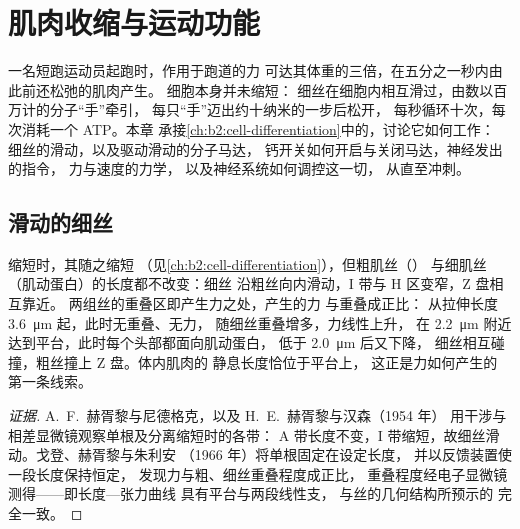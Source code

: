\chapter{肌肉收缩与运动功能}\label{ch:b2:muscle-movement}

一名短跑运动员起跑时，作用于跑道的力
可达其体重的三倍，在五分之一秒内由此前还松弛的肌肉产生。
细胞本身并未缩短：
细丝在细胞内相互滑过，由数以百万计的分子“手”牵引，
每只“手”迈出约十纳米的一步后松开，
每秒循环十次，每次消耗一个 ATP。本章
承接\cref{ch:b2:cell-differentiation}中的，讨论它如何工作：
细丝的滑动，以及驱动滑动的分子马达，
钙开关如何开启与关闭马达，神经发出的指令，
力与速度的力学，
以及神经系统如何调控这一切，
从直至冲刺。

\section{滑动的细丝}

\begin{proposition}[肌丝滑动机制]\label{prop:b2:muscle-movement:sliding}
缩短时，其随之缩短
（见\cref{ch:b2:cell-differentiation}），但粗肌丝（）
与细肌丝（肌动蛋白）的长度都不改变：细丝
沿粗丝向内滑动，I 带与 H 区变窄，Z 盘相互靠近。
两组丝的重叠区即产生力之处，产生的力
与重叠成正比：
从拉伸长度 \qty{3.6}{\micro m} 起，此时无重叠、无力，
随细丝重叠增多，力线性上升，
在 \qty{2.2}{\micro m} 附近达到平台，此时每个头部都面向肌动蛋白，
低于 \qty{2.0}{\micro m} 后又下降，
细丝相互碰撞，粗丝撞上 Z 盘。体内肌肉的
静息长度恰位于平台上，
这正是力如何产生的
第一条线索。
\end{proposition}
\begin{proof}[证据]
A.~F.~赫胥黎与尼德格克，以及 H.~E.~赫胥黎与汉森（1954 年）
用干涉与相差显微镜观察单根及分离缩短时的各带：
A 带长度不变，I 带缩短，故细丝滑动。戈登、赫胥黎与朱利安
（1966 年）将单根固定在设定长度，
并以反馈装置使一段长度保持恒定，
发现力与粗、细丝重叠程度成正比，
重叠程度经电子显微镜测得——即长度—张力曲线
具有平台与两段线性支，
与丝的几何结构所预示的
完全一致。
\end{proof}


